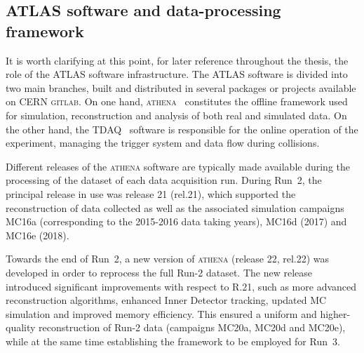 
\subsection{ATLAS software and data-processing framework}
\label{sec:athena}

It is worth clarifying at this point, for later reference throughout the thesis, the role of the ATLAS software infrastructure. The ATLAS software is divided into two main branches, built and distributed in several packages or projects available on CERN \textsc{gitlab}. On one hand, \textsc{athena}~\cite{athena} constitutes the offline framework used for simulation, reconstruction and analysis of both real and simulated data. On the other hand, the TDAQ~\cite{tdaq} software is responsible for the online operation of the experiment, managing the trigger system and data flow during collisions. 

Different releases of the \textsc{athena} software are typically made available during the processing of the dataset of each data acquisition run. During Run~2, the principal release in use was release 21 (rel.21), which supported the reconstruction of data collected as well as the associated simulation campaigns MC16a (corresponding to the 2015-2016 data taking years), MC16d (2017) and MC16e (2018). 

Towards the end of Run~2, a new version of \textsc{athena} (release 22, rel.22) was developed in order to reprocess the full Run-2 dataset. The new release introduced significant improvements with respect to R.21, such as more advanced reconstruction algorithms, enhanced Inner Detector tracking, updated MC simulation and improved memory efficiency. This ensured a uniform and higher-quality reconstruction of Run-2 data (campaigns MC20a, MC20d and MC20e), while at the same time establishing the framework to be employed for Run~3.

